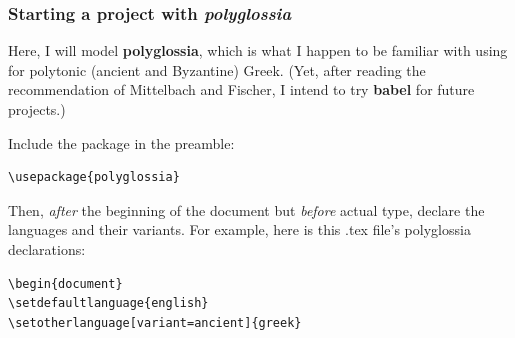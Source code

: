 \documentclass[aspectratio=169]{beamer}
\begin{document}
\begin{frame}[fragile]
	\frametitle[Using polyglossia]{Starting a project with \textit{polyglossia}}

Here, I will model \textbf{polyglossia}, which is what I happen to be familiar with using for polytonic (ancient and Byzantine) Greek. {\footnotesize (Yet, after reading the recommendation of Mittelbach and Fischer, I intend to try \textbf{babel} for future projects.)} \break

Include the package in the preamble:
\begin{lstlisting}
\usepackage{polyglossia}
\end{lstlisting} 

\vspace{1em}

Then, \emph{after} the beginning of the document but \emph{before} actual type, declare the languages and their variants. For example, here is this .tex file's polyglossia declarations:

\begin{lstlisting}
\begin{document}
\setdefaultlanguage{english}
\setotherlanguage[variant=ancient]{greek}
\end{lstlisting}

\end{frame}

\end{document}
